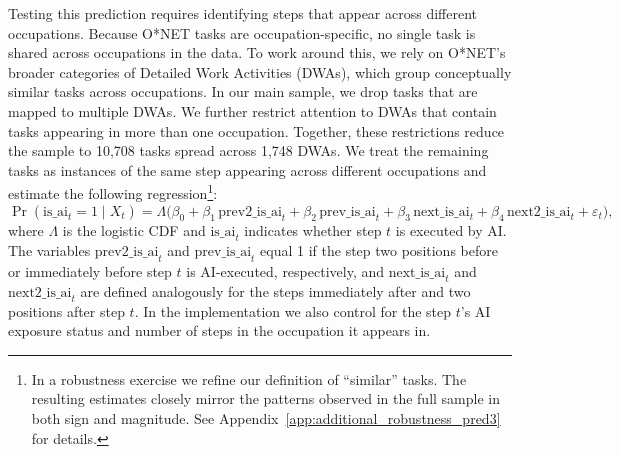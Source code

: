 Testing this prediction requires identifying steps that appear across different occupations.  
Because O*NET tasks are occupation-specific, no single task is shared across occupations in the data.  
To work around this, we rely on O*NET's broader categories of Detailed Work Activities (DWAs), which group conceptually similar tasks across occupations.  
In our main sample, we drop tasks that are mapped to multiple DWAs.
We further restrict attention to DWAs that contain tasks appearing in more than one occupation.  
Together, these restrictions reduce the sample to 10{,}708 tasks spread across 1{,}748 DWAs.  
We treat the remaining tasks as instances of the same step appearing across different occupations and estimate the following regression\footnote{In a robustness exercise we refine our definition of ``similar'' tasks.
The resulting estimates closely mirror the patterns observed in the full sample in both sign and magnitude.
See Appendix~\ref{app:additional_robustness_pred3} for details.}:
\begin{equation}
    \Pr\!\left( \text{is\_ai}_{t} = 1 \mid X_t \right)
    =
    \Lambda\!\Big(
        \beta_0 
        + \beta_1 \, \text{prev2\_is\_ai}_{t}
        + \beta_2 \, \text{prev\_is\_ai}_{t}
        + \beta_3 \, \text{next\_is\_ai}_{t}
        + \beta_4 \, \text{next2\_is\_ai}_{t}
        + \varepsilon_t
    \Big),
    \label{eq:DWA_regression_ai}
\end{equation}
where $\Lambda$ is the logistic CDF and \emph{$\text{is\_ai}_{t}$} indicates whether step $t$ is executed by AI.
The variables \emph{$\text{prev2\_is\_ai}_{t}$} and \emph{$\text{prev\_is\_ai}_{t}$} equal 1 if the step two positions before or immediately before step $t$ is AI-executed, respectively, and \emph{$\text{next\_is\_ai}_{t}$} and \emph{$\text{next2\_is\_ai}_{t}$} are defined analogously for the steps immediately after and two positions after step $t$.
In the implementation we also control for the step $t$'s AI exposure status and number of steps in the occupation it appears in.

